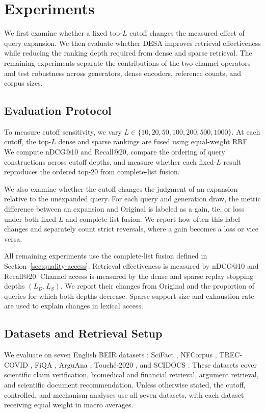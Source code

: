 \section{Experiments}
\label{sec:experiments}

We first examine whether a fixed top-$L$ cutoff changes the measured effect of
query expansion. We then evaluate whether DESA improves retrieval effectiveness while
reducing the ranking depth required from dense and sparse retrieval. The
remaining experiments separate the contributions of the two channel operators
and test robustness across generators, dense encoders, reference counts, and
corpus sizes.

\subsection{Evaluation Protocol}

To measure cutoff sensitivity, we vary
$L\in\{10,20,50,100,200,500,1000\}$. At each cutoff, the top-$L$ dense and
sparse rankings are fused using equal-weight RRF
\citep{cormack-etal-2009-rrf}. We compute nDCG@10
\citep{jarvelin-kekalainen-2002-cumulated} and Recall@20, compare the ordering
of query constructions across cutoff depths, and measure whether each fixed-$L$
result reproduces the ordered top-20 from complete-list fusion.

We also examine whether the cutoff changes the judgment of an expansion
relative to the unexpanded query. For each query and generation draw, the
metric difference between an expansion and Original is labeled as a gain, tie,
or loss under both fixed-$L$ and complete-list fusion. We report how often this
label changes and separately count strict reversals, where a gain becomes a
loss or vice versa.

All remaining experiments use the complete-list fusion defined in
Section~\ref{sec:quality-access}. Retrieval effectiveness is measured by nDCG@10 and
Recall@20. Channel access is measured by the dense and sparse replay stopping
depths $(L_D,L_S)$. We report their changes from Original and the proportion of
queries for which both depths decrease. Sparse support size and exhaustion rate
are used to explain changes in lexical access.

\subsection{Datasets and Retrieval Setup}

We evaluate on seven English BEIR datasets \citep{thakur-etal-2021-beir}: SciFact
\citep{wadden-etal-2020-fact}, NFCorpus \citep{boteva-etal-2016-fulltext},
TREC-COVID \citep{voorhees-etal-2020-trec-covid}, FiQA
\citep{maia-etal-2018-fiqa}, ArguAna \citep{wachsmuth-etal-2018-retrieval},
Touch\'e-2020 \citep{bondarenko-etal-2020-touche}, and SCIDOCS
\citep{cohan-etal-2020-specter}. These datasets cover scientific claim
verification, biomedical and financial retrieval, argument retrieval, and
scientific document recommendation. Unless otherwise stated, the cutoff,
controlled, and mechanism analyses use all seven datasets, with each dataset
receiving equal weight in macro averages.

